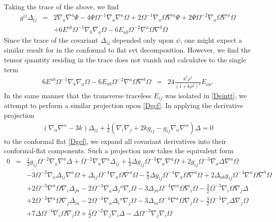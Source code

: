 \documentclass[10pt,letterpaper]{article}
\numberwithin{equation}{section}
\begin{document}
Taking the trace of the above, we find
\begin{eqnarray}
g^{ij}\Delta_{ij}&=&2 \nabla_{a}\nabla^{a}\Psi - 4 \Psi \Omega^{-1} \nabla_{a}\nabla^{a}\Omega + 2 \Omega^{-1} \nabla_{a}\Omega \nabla^{a}\Psi + 2 \Psi \Omega^{-2} \nabla_{a}\Omega \nabla^{a}\Omega
\nonumber\\
&& + 6 E^{ab} \Omega^{-1} \nabla_{b}\nabla_{a}\Omega - 6 E_{ab} \Omega^{-2} \nabla^{a}\Omega \nabla^{b}\Omega
\label{dgcftr}
\end{eqnarray}
Since the trace of the covariant $\Delta_{ij}$ depended only upon $\psi$, one might expect a similar result for in the conformal to flat svt decomposition. However, we find the tensor quantity residing in the trace does not vanish and calculates to the single term
\begin{eqnarray}
6 E^{ab} \Omega^{-1} \nabla_{b}\nabla_{a}\Omega - 6 E_{ab} \Omega^{-2} \nabla^{a}\Omega \nabla^{b}\Omega
&=& 24\frac{k^2\rho^2}{(1+k\rho^2)^2}E_{\rho\rho}.
\end{eqnarray}
%
In the same manner that the transverse traceless $E_{ij}$ was isolated in \eqref{Deintt}, we attempt to perform a similar projection upon \eqref{Dgcf}. In applying the derivative projection
\begin{eqnarray}
(\nabla_\alpha\nabla^\alpha - 3k)\Delta_{ij} + \frac12 ( \nabla_i\nabla_j + 2k g_{ij} - g_{ij}\nabla_\alpha\nabla^\alpha )\Delta=0
\end{eqnarray}
to the conformal flat \eqref{Dgcf}, we expand all covariant derivatives into their conformal-flat components. Such a projection now takes the equivalent form
\begin{eqnarray}
0&=& \tfrac{1}{2} g_{ij} \Omega^{-2} \nabla_{a}\nabla^{a}\Delta
+ \Omega^{-2} \nabla_{a}\nabla^{a}\Delta_{ij}
+ \tfrac{1}{3} \Delta g_{ij} \Omega^{-3} \nabla_{a}\nabla^{a}\Omega
+ 2 g_{ij} \Omega^{-3} \nabla_{a}\Delta \nabla^{a}\Omega\nonumber\\
&& - 3 \Omega^{-3} \nabla_{a}\Delta_{ij} \nabla^{a}\Omega
+ \Delta_{ij} \Omega^{-4} \nabla_{a}\Omega \nabla^{a}\Omega
-  \tfrac{8}{3} \Delta g_{ij} \Omega^{-4} \nabla_{a}\Omega \nabla^{a}\Omega
+ 2 \Delta_{ab} g_{ij} \Omega^{-4} \nabla^{a}\Omega \nabla^{b}\Omega\nonumber\\
&& + 2 \Omega^{-3} \nabla^{a}\Omega \nabla_{i}\Delta_{ja}
- 2 \Omega^{-3} \nabla_{a}\Delta_{j}{}^{a} \nabla_{i}\Omega
- 3 \Delta_{ja} \Omega^{-4} \nabla^{a}\Omega \nabla_{i}\Omega
-  \tfrac{3}{2} \Omega^{-3} \nabla_{i}\Omega \nabla_{j}\Delta\nonumber\\
&& + 2 \Omega^{-3} \nabla^{a}\Omega \nabla_{j}\Delta_{ia}
- 2 \Omega^{-3} \nabla_{a}\Delta_{i}{}^{a} \nabla_{j}\Omega
- 3 \Delta_{ia} \Omega^{-4} \nabla^{a}\Omega \nabla_{j}\Omega
-  \tfrac{3}{2} \Omega^{-3} \nabla_{i}\Delta \nabla_{j}\Omega\nonumber\\
&& + 7 \Delta \Omega^{-4} \nabla_{i}\Omega \nabla_{j}\Omega
+ \tfrac{1}{2} \Omega^{-2} \nabla_{j}\nabla_{i}\Delta
-  \Delta \Omega^{-3} \nabla_{j}\nabla_{i}\Omega
\label{dgcftt1}
\end{eqnarray}
\end{document}
